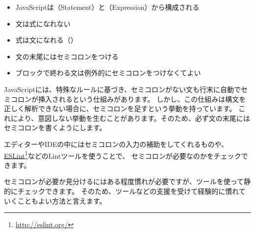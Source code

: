 \begin{itemize}
\item
  JavaScriptは（Statement）と（Expression）から構成される
\item
  文は式になれない
\item
  式は文になれる（）
\item
  文の末尾にはセミコロンをつける
\item
  ブロックで終わる文は例外的にセミコロンをつけなくてよい
\end{itemize}

JavaScriptには、特殊なルールに基づき、セミコロンがない文も行末に自動でセミコロンが挿入されるという仕組みがあります。
しかし、この仕組みは構文を正しく解析できない場合に、セミコロンを足すという挙動を持っています。
これにより、意図しない挙動を生むことがあります。そのため、必ず文の末尾にはセミコロンを書くようにします。

エディターやIDEの中にはセミコロンの入力の補助をしてくれるものや、\href{http://eslint.org/}{ESLint}\footnote{\url{http://eslint.org/}}などのLintツールを使うことで、
セミコロンが必要なのかをチェックできます。

セミコロンが必要か見分けるにはある程度慣れが必要ですが、ツールを使って静的にチェックできます。
そのため、ツールなどの支援を受けて経験的に慣れていくこともよい方法と言えます。
